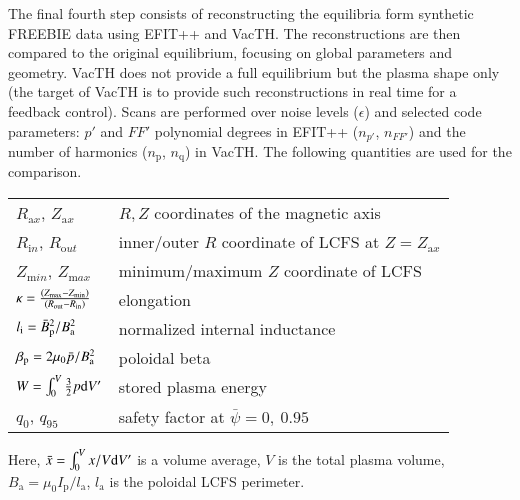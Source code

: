 The final fourth step consists of reconstructing the equilibria form synthetic FREEBIE data using EFIT++ and VacTH. The reconstructions are then compared to the original equilibrium, focusing on global parameters and geometry. VacTH does not provide a full equilibrium but the plasma shape only (the target of VacTH is to provide such reconstructions in real time for a feedback control). Scans are performed over noise levels ($\epsilon$) and selected code parameters: $p'$ and $FF'$ polynomial degrees in EFIT++ ($n_{p'}$, $n_{FF'}$) and the number of harmonics ($n_{\mathrm p}$, $n_{\mathrm q}$) in VacTH. The following quantities are used for the comparison.
\begin{table}[!h]
    \begin{tabular}{ll}
    $R_{\mathrm ax}$, $Z_{\mathrm ax}$ & $R,Z$ coordinates of the magnetic axis \\
    $R_{\mathrm in}$, $R_{\mathrm out}$ & inner/outer $R$ coordinate of LCFS at $Z=Z_{\mathrm ax}$ \\
    $Z_{\mathrm min}$, $Z_{\mathrm max}$ & minimum/maximum $Z$ coordinate of LCFS \\
    $\kappa  = \frac{\left( {{Z_{{\rm{max}}}} - {Z_{{\rm{min}}}}} \right) } { \left( {{R_{{\rm{out}}}} - {R_{{\rm{in}}}}} \right) }$          & elongation   \\
    ${l_{\rm{i}}} = {{\bar B_{\rm{p}}^2}} / {{B_{\rm{a}}^2}}$          & normalized internal inductance   \\
    ${\beta _{\rm{p}}} = {{2{\mu _0}\bar p}} / {{B_{\rm{a}}^2}}$          & poloidal beta   \\
    $ W = \int_0^V {\frac{3}{2}p{\rm{d}}V'}$ & stored plasma energy \\
    $ q_0$, $q_{95}$ & safety factor at $\bar \psi = 0,\ 0.95$ \\
    \end{tabular}
\end{table}

Here, $\bar x = \int_0^V {x/V{\rm{d}}V'} $ is a volume average, $V$ is the total plasma volume, $B_{\mathrm a} = \mu _0 I_\mathrm{p} / l_{\mathrm a}$, $l_{\mathrm a}$ is the poloidal LCFS perimeter.



